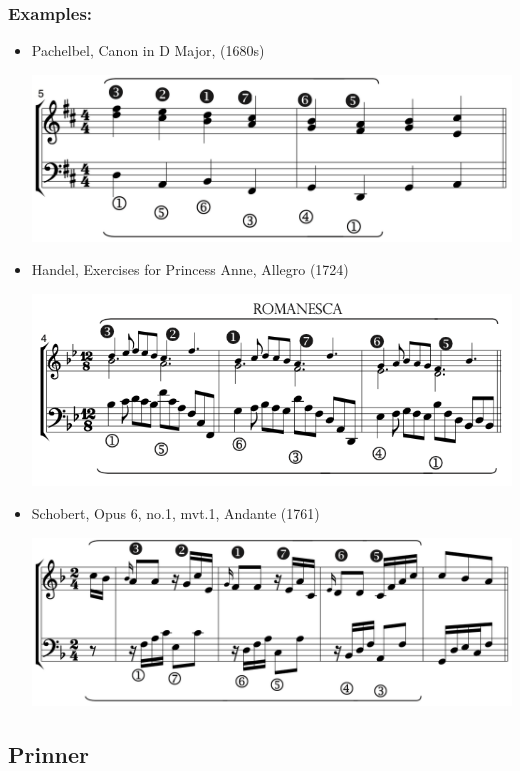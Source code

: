 \documentclass[11pt, openany]{article}
\begin{document}
\subsubsection{Examples:}
\begin{itemize}
\item Pachelbel, Canon in D Major, (1680s)
\begin{center}
\includegraphics[scale=0.5]{pachelbelcanon.png}
\end{center}
\item Handel, Exercises for Princess Anne, Allegro (1724)
\begin{center}
\includegraphics[scale=0.5]{handelanne.png}
\end{center}
\item Schobert, Opus 6, no.1, mvt.1, Andante (1761)
\begin{center}
\includegraphics[scale=0.5]{schobert6.png}
\end{center}
\end{itemize}


	\subsection{Prinner}
	
\end{document}
